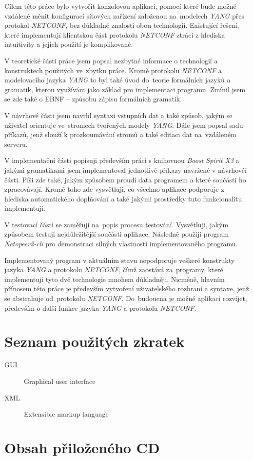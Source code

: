 \documentclass[thesis=B,czech,hidelinks]{FITthesis}[2019/03/06]
\begin{document}
\begin{conclusion}
Cílem této práce bylo vytvořit konzolovou aplikaci, pomocí které bude možné vzdáleně měnit konfiguraci síťových zařízení založenou na~modelech \textit{YANG} přes protokol \textit{NETCONF}, bez důkladné znalosti obou technologií. Existující řešení, které implementují klientskou část protokolu \textit{NETCONF} ztrácí z hlediska intuitivity a jejich použití je komplikované.

V teoretické části práce jsem popsal nezbytné informace o technologií a konstruktech použitých ve~zbytku práce. Kromě protokolu \textit{NETCONF} a modelovacího jazyka \textit{YANG} to byl také úvod do~teorie formálních jazyků a gramatik, kterou využívám jako základ pro implementaci programu. Zmínil jsem se zde také o EBNF -- způsobu zápisu formálních gramatik.

V návrhové části jsem navrhl syntaxi vstupních dat a také způsob, jakým se uživatel orientuje ve~stromech tvořených modely \textit{YANG}. Dále jsem popsal sadu příkazů, jenž slouží k prozkoumávání stromů a také editaci dat na~vzdáleném serveru.

V implementační části popisuji především práci s knihovnou \textit{Boost Spirit X3} a jakými gramatikami jsem implementoval jednotlivé příkazy navržené v návrhovéí části. Píši zde také, jakým způsobem proudí data programem a které součásti ho zpracovávají. Kromě toho zde vysvětluji, co všechno aplikace podporuje z hlediska automatického doplňování a také jakými prostředky tuto funkcionalitu implementuji.

V testovací části se zaměřuji na~popis procesu testování. Vysvětluji, jakým způsobem testuji nejdůležitější součásti aplikace. Následně použiji program \textit{Netopeer2-cli} pro demonstraci silných vlastností implementovaného programu.

Implementovaný program v aktuálním stavu nepodporuje veškeré konstrukty jazyka \textit{YANG} a protokolu \textit{NETCONF}, čímž zaostává za~programy, které implementují tyto dvě technologie mnohem důkladněji. Nicméně, hlavním přínosem této práce je především vytvoření uživatelského rozhraní a syntaxe, jenž se abstrahuje od~protokolu \textit{NETCONF}. Do~budoucna je možné aplikaci rozvíjet, především o další funkce jazyka \textit{YANG} a protokolu \textit{NETCONF}.
\end{conclusion}

\printbibliography{}

\appendix

\chapter{Seznam použitých zkratek}
\begin{description}
    \item[GUI] Graphical user interface
    \item[XML] Extensible markup language
\end{description}

\chapter{Obsah přiloženého CD}

\end{document}
